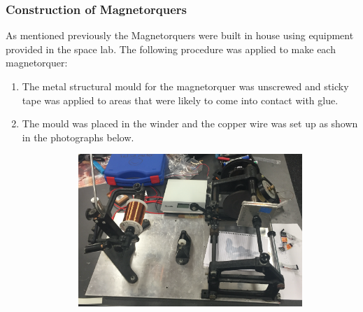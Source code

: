 \subsubsection{Construction of Magnetorquers}
As mentioned previously the Magnetorquers were built in house using equipment provided in the space lab.  The following procedure was applied to make each magnetorquer:
\begin{enumerate}
	\item The metal structural mould for the magnetorquer was unscrewed and sticky tape was applied to areas that were likely to come into contact with glue.
	\item The mould was placed in the winder and the copper wire was set up as shown in the photographs below.
	\begin{center}
	\begin{figure}[H]
	\caption{Magnetorquer Construction Set Up}
	\begin{subfigure}{0.5\textwidth}
	\includegraphics[scale = 0.35]{Construction_1.png}
	\end{subfigure}
	\hspace{10mm}
	\begin{subfigure}{0.5\textwidth}

\end{subfigure}
\end{figure}
\end{center}
\end{enumerate}
